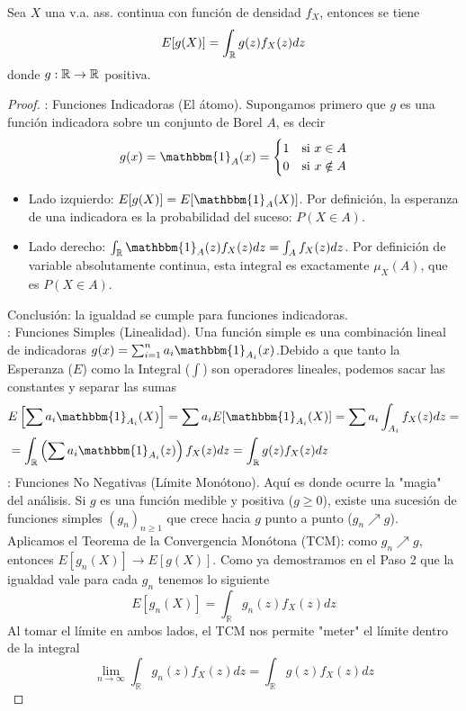 \begin{prop}
    Sea $X$ una v.a. ass. continua con función de densidad $f_X$, entonces se tiene
    \begin{equation*}
        E[g(X)]=\int_{\mathbb{R}} g(z)f_X(z)dz
    \end{equation*}
    donde $g:\mathbb{R} \to \mathbb{R}$ positiva.
    \begin{proof}
        : Funciones Indicadoras (El átomo). Supongamos primero que $g$ es una función indicadora sobre un conjunto de Borel $A$, es decir
        $$g(x) = \mathbbm{1}_A(x) = \begin{cases} 1 & \text{si } x \in A \\ 0 & \text{si } x \notin A \end{cases}$$
        
        \begin{itemize}
            \item Lado izquierdo: $E[g(X)] = E[\mathbbm{1}_A(X)]$. Por definición, la esperanza de una indicadora es la probabilidad del suceso: $P(X \in A)$.
            \item Lado derecho: $\int_{\mathbb{R}} \mathbbm{1}_A(z) f_X(z) dz = \int_A f_X(z) dz$. Por definición de variable absolutamente continua, esta integral es exactamente $\mu_X(A)$, que es $P(X \in A)$.
        \end{itemize}
        Conclusión: la igualdad se cumple para funciones indicadoras. \\
        : Funciones Simples (Linealidad). Una función simple es una combinación lineal de indicadoras $g(x) = \sum_{i=1}^n a_i \mathbbm{1}_{A_i}(x)$.Debido a que tanto la Esperanza ($E$) como la Integral ($\int$) son operadores lineales, podemos sacar las constantes y separar las sumas
        \begin{align*}
            &E\left[ \sum a_i \mathbbm{1}_{A_i}(X) \right] = \sum a_i E[\mathbbm{1}_{A_i}(X)] = \sum a_i \int_{A_i} f_X(z) dz =\\
            &= \int_{\mathbb{R}} \left( \sum a_i \mathbbm{1}_{A_i}(z) \right) f_X(z) dz=\int_{\R}g(z)f_X(z)dz
        \end{align*}
        : Funciones No Negativas (Límite Monótono). Aquí es donde ocurre la "magia" del análisis. Si $g$ es una función medible y positiva ($g \geq 0$), existe una sucesión de funciones simples $(g_n)_{n \geq 1}$ que crece hacia $g$ punto a punto ($g_n \nearrow g$).  \\
        \noindent
        Aplicamos el Teorema de la Convergencia Monótona (TCM): como $g_n \nearrow g$, entonces \mbox{$E[g_n(X)] \to E[g(X)]$}. Como ya demostramos en el Paso 2 que la igualdad vale para cada $g_n$ tenemos lo siguiente
        $$E[g_n(X)] = \int_{\mathbb{R}} g_n(z) f_X(z) dz$$
        Al tomar el límite en ambos lados, el TCM nos permite "meter" el límite dentro de la integral
        $$\lim_{n \to \infty} \int_{\mathbb{R}} g_n(z) f_X(z) dz = \int_{\mathbb{R}} g(z) f_X(z) dz$$
    \end{proof}
\end{prop}


